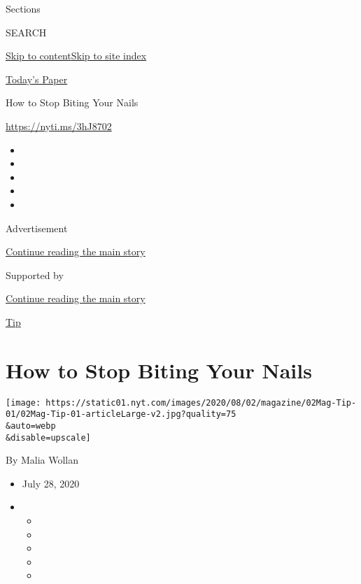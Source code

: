 Sections

SEARCH

\protect\hyperlink{site-content}{Skip to
content}\protect\hyperlink{site-index}{Skip to site index}

\href{https://myaccount.nytimes.com/auth/login?response_type=cookie\&client_id=vi}{}

\href{https://www.nytimes.com/section/todayspaper}{Today's Paper}

How to Stop Biting Your Nails

\url{https://nyti.ms/3hJ8702}

\begin{itemize}
\item
\item
\item
\item
\item
\end{itemize}

Advertisement

\protect\hyperlink{after-top}{Continue reading the main story}

Supported by

\protect\hyperlink{after-sponsor}{Continue reading the main story}

\href{/column/magazine-tip}{Tip}

\hypertarget{how-to-stop-biting-your-nails}{%
\section{How to Stop Biting Your
Nails}\label{how-to-stop-biting-your-nails}}

\texttt{[image: https://static01.nyt.com/images/2020/08/02/magazine/02Mag-Tip-01/02Mag-Tip-01-articleLarge-v2.jpg?quality=75\\\&auto=webp\\\&disable=upscale]}

By Malia Wollan

\begin{itemize}
\item
  July 28, 2020
\item
  \begin{itemize}
  \item
  \item
  \item
  \item
  \item
  \end{itemize}
\end{itemize}

